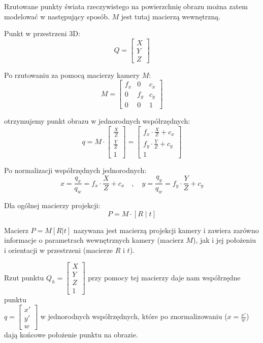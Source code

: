 \documentclass[magisterska]{pracadypl}
\begin{document}
Rzutowane punkty świata rzeczywistego na powierzchnię obrazu można zatem modelować w następujący sposób. $M$ jest tutaj macierzą wewnętrzną.

\bigskip

Punkt w przestrzeni 3D:
\[
Q = \begin{bmatrix} X \\ Y \\ Z \end{bmatrix}
\]

Po rzutowaniu za pomocą macierzy kamery $M$:
\[
M = \begin{bmatrix}
f_x & 0 & c_x \\
0 & f_y & c_y \\
0 & 0 & 1
\end{bmatrix}
\]

otrzymujemy punkt obrazu w jednorodnych współrzędnych:
\[
q = M \cdot \begin{bmatrix}
\frac{X}{Z} \\
\frac{Y}{Z} \\
1
\end{bmatrix}
=
\begin{bmatrix}
f_x \cdot \frac{X}{Z} + c_x \\
f_y \cdot \frac{Y}{Z} + c_y \\
1
\end{bmatrix}
\]

Po normalizacji współrzędnych jednorodnych:
\[
x = \frac{q_x}{q_w} = f_x \cdot \frac{X}{Z} + c_x
\quad , \quad
y = \frac{q_y}{q_w} = f_y \cdot \frac{Y}{Z} + c_y
\]

Dla ogólnej macierzy projekcji:
\[
P = M \cdot [R \;|\; t]
\]

Macierz \( P = M[R | t] \) nazywana jest macierzą projekcji kamery i zawiera zarówno informacje o parametrach wewnętrznych kamery (macierz \( M \)), jak i jej położeniu i orientacji w przestrzeni (macierze \( R \) i \( t \)).

Rzut punktu \( Q_h = \begin{bmatrix} X \\ Y \\ Z \\ 1 \end{bmatrix} \) przy pomocy tej macierzy daje nam współrzędne punktu\\ \( q = \begin{bmatrix} x' \\ y' \\ w \end{bmatrix} \) w jednorodnych współrzędnych, które po znormalizowaniu (\( x = \frac{x'}{w} \)) dają końcowe położenie punktu na obrazie.
\end{document}
